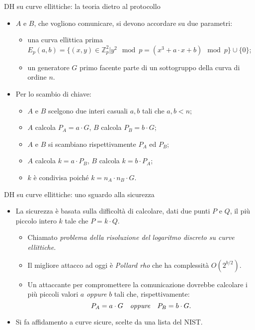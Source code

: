 \documentclass[11pt,svgnames,smaller,aspectratio=169,italian]{beamer}
\begin{document}
\begin{frame}{DH su curve ellittiche: la teoria dietro al protocollo}
	\begin{itemize}
		\item $A$ e $B$, che vogliono comunicare, si devono accordare su due parametri:
			\begin{itemize}
				\item una curva ellittica prima $E_{p}(a, b) = \{(x, y) \in \mathds{Z}_{p}^{2} | y^{2} \mod p = (x^{3} + a \cdot x + b) \mod p \} \cup \{0\}$;
				\item un generatore $G$ primo facente parte di un sottogruppo della curva di ordine $n$.
			\end{itemize}
		\item Per lo scambio di chiave:
			\begin{itemize}
				\item $A$ e $B$ scelgono due interi casuali $a, b$ tali che $a, b < n$;
				\item $A$ calcola $P_{A} = a \cdot G$, $B$ calcola $P_{B} = b \cdot G$;
				\item $A$ e $B$ si scambiano rispettivamente $P_{A}$ ed $P_{B}$;
				\item $A$ calcola $k = a \cdot P_{B}$, $B$ calcola $k = b \cdot P_{A}$;
				\item $k$ è condivisa poiché $k = n_{A} \cdot n_{B} \cdot G$.
			\end{itemize}
	\end{itemize}
\end{frame}

\begin{frame}{DH su curve ellittiche: uno sguardo alla sicurezza}
	\begin{itemize}
		\item La sicurezza è basata sulla difficoltà di calcolare, dati due punti $P$ e $Q$, il più piccolo intero $k$ tale che $P = k \cdot Q$.
			\begin{itemize}
				\item Chiamato \emph{problema della risoluzione del logaritmo discreto su curve ellittiche}.
				\item Il migliore attacco ad oggi è \emph{Pollard rho} che ha complessità $O(2^{b/2})$.
				\item Un attaccante per compromettere la comunicazione dovrebbe calcolare i più piccoli valori $a$ \emph{oppure} $b$ tali che, rispettivamente:
					\begin{equation*}
						P_{A} = a \cdot G	\quad\text{\emph{oppure}}	\quad P_{B} = b \cdot G.
					\end{equation*}
			\end{itemize}
		\item Si fa affidamento a curve sicure, scelte da una lista del NIST.
	\end{itemize}
\end{frame}
\end{document}

